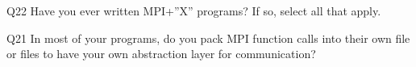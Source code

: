 \begin{description}%
\item{Q22} Have you ever written MPI+”X” programs? If so, select all that apply.%
\item{Q21} In most of your programs, do you pack MPI function calls into their own file or files to have your own abstraction layer for communication?%
\end{description}%
